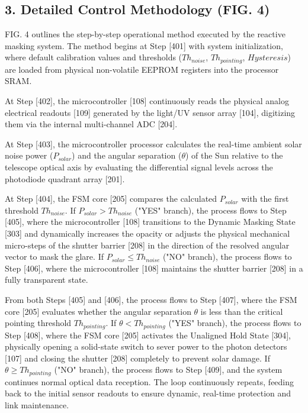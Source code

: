 \documentclass[12pt,a4paper]{article}
\begin{document}
\subsection*{3. Detailed Control Methodology (FIG. 4)}
FIG. 4 outlines the step-by-step operational method executed by the reactive masking system.
The method begins at Step [401] with system initialization, where default calibration values and thresholds ($Th_{noise}$, $Th_{pointing}$, $Hysteresis$) are loaded from physical non-volatile EEPROM registers into the processor SRAM.

At Step [402], the microcontroller [108] continuously reads the physical analog electrical readouts [109] generated by the light/UV sensor array [104], digitizing them via the internal multi-channel ADC [204].

At Step [403], the microcontroller processor calculates the real-time ambient solar noise power ($P_{solar}$) and the angular separation ($\theta$) of the Sun relative to the telescope optical axis by evaluating the differential signal levels across the photodiode quadrant array [201].

At Step [404], the FSM core [205] compares the calculated $P_{solar}$ with the first threshold $Th_{noise}$. 
If $P_{solar} > Th_{noise}$ ("YES" branch), the process flows to Step [405], where the microcontroller [108] transitions to the Dynamic Masking State [303] and dynamically increases the opacity or adjusts the physical mechanical micro-steps of the shutter barrier [208] in the direction of the resolved angular vector to mask the glare.
If $P_{solar} \le Th_{noise}$ ("NO" branch), the process flows to Step [406], where the microcontroller [108] maintains the shutter barrier [208] in a fully transparent state.

From both Steps [405] and [406], the process flows to Step [407], where the FSM core [205] evaluates whether the angular separation $\theta$ is less than the critical pointing threshold $Th_{pointing}$.
If $\theta < Th_{pointing}$ ("YES" branch), the process flows to Step [408], where the FSM core [205] activates the Unaligned Hold State [304], physically opening a solid-state switch to sever power to the photon detectors [107] and closing the shutter [208] completely to prevent solar damage.
If $\theta \ge Th_{pointing}$ ("NO" branch), the process flows to Step [409], and the system continues normal optical data reception.
The loop continuously repeats, feeding back to the initial sensor readouts to ensure dynamic, real-time protection and link maintenance.
\end{document}
